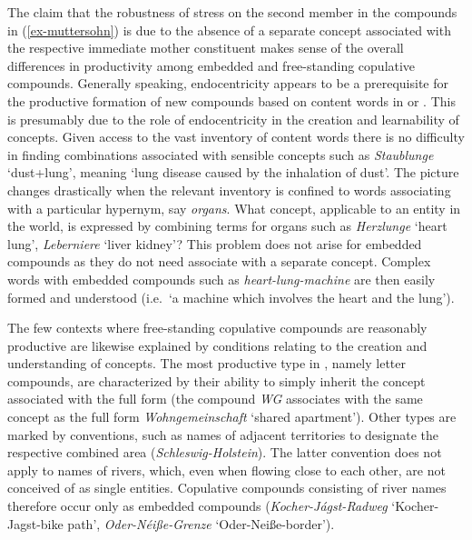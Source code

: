 \documentclass[output=paper
 ,nobabel
 ,draftmode
 ,colorlinks, citecolor=brown
]{langscibook}
\begin{document}
The claim that the robustness of stress on the second member in the compounds in
(\ref{ex-muttersohn}) is due to the absence of a separate concept associated with the respective
immediate mother constituent makes sense of the overall differences in productivity among embedded
and free-standing copulative compounds. Generally speaking, endocentricity appears to be a
prerequisite for the productive formation of new compounds based on content words in  or
. This is presumably due to the role of endocentricity in the creation and learnability of
concepts. Given access to the vast inventory of content words there is no difficulty in finding
combinations associated with sensible concepts such as \emph{Staublunge} `dust+lung', meaning `lung
disease caused by the inhalation of dust'. The picture changes drastically when the relevant
inventory is confined to words associating with a particular hypernym, say \emph{organs}. What
concept, applicable to an entity in the world, is expressed by combining terms for organs such as
\emph{Herzlunge} `heart lung', \emph{Leberniere } `liver kidney'? This problem does not arise for
embedded compounds as they do not need associate with a separate concept. Complex words with
embedded compounds such as \emph{heart-lung-machine} are then easily formed and understood (i.e.\ `a
machine which involves the heart and the lung'). 

The few contexts where free-standing copulative compounds are reasonably productive are likewise
explained by conditions relating to the creation and understanding of concepts. The most productive
type in , namely letter compounds, are characterized by their ability to simply inherit the
concept associated with the full form (\eg the compound \emph{WG} associates with the same concept
as the full form \emph{Wohngemeinschaft} `shared apartment'). Other types are marked by conventions,
such as names of adjacent territories to designate the respective combined area
(\emph{Schleswig-Holstein}). The latter convention does not apply to names of rivers, which, even
when flowing close to each other, are not conceived of as single entities. Copulative compounds
consisting of river names therefore occur only as embedded compounds (\eg \emph{Kocher-Jágst-Radweg}
`Kocher-Jagst-bike path', \emph{Oder-Néiße-Grenze} `Oder-Neiße-border').
\end{document}
